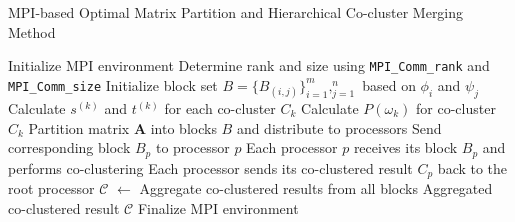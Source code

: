 \documentclass[journal]{IEEEtran}
\begin{document}
\begin{algorithm}[!t]
    \caption{MPI-based Optimal Matrix Partition and Hierarchical Co-cluster Merging Method}\label{alg:mpi_method}
    \begin{algorithmic}[1]
        \STATE Initialize MPI environment
        \STATE Determine rank and size using \texttt{MPI\_Comm\_rank} and \texttt{MPI\_Comm\_size}
        \STATE Initialize block set $B = \{B_{(i,j)}\}_{i=1}^m,_{j=1}^n$ based on $\phi_i$ and $\psi_j$
        \STATE Calculate $s^{(k)}$ and $t^{(k)}$ for each co-cluster $C_k$
        \STATE Calculate $P(\omega_k)$ for co-cluster $C_k$
        \STATE Partition matrix $\mathbf{A}$ into blocks $B$ and distribute to processors
        \STATE Send corresponding block $B_p$ to processor $p$
        \ENDFOR
        \ENDIF
        \ENDFOR
        \ENDIF
        \STATE Each processor $p$ receives its block $B_p$ and performs co-clustering
        \STATE Each processor sends its co-clustered result $C_p$ back to the root processor
        \STATE $\mathcal{C}$ $\gets$ Aggregate co-clustered results from all blocks
        \RETURN Aggregated co-clustered result $\mathcal{C}$
        \ENDIF
        \STATE Finalize MPI environment
    \end{algorithmic}
\end{algorithm}
\end{document}
